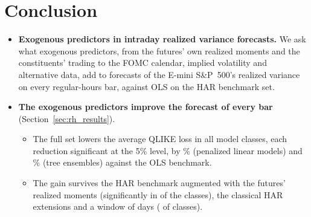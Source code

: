 \section{Conclusion}
\label{sec:rh_conclusion}
\begin{itemize}
\item \textbf{Exogenous predictors in intraday realized variance forecasts.} We ask what exogenous predictors, from
  the futures' own realized moments and the constituents' trading to the FOMC calendar, implied volatility and
  alternative data, add to forecasts of the E-mini S\&P~500's realized variance on every regular-hours bar,
  against OLS on the HAR benchmark set.
\item \textbf{The exogenous predictors improve the forecast of every bar} (Section~\ref{sec:rh_results}).
  \begin{itemize}
  \item The full set lowers the average QLIKE loss in all \rhorAfPairs{} model classes, each reduction significant at
    the 5\% level, by \rhorVsOlsRedLinRng{}\% (penalized linear models) and \rhorVsOlsRedTreeRng{}\%
    (tree ensembles) against the OLS benchmark.
  \item The gain survives the HAR benchmark augmented with the futures' realized moments (significantly in
    \rhabNClassesBeatAddRm{} of the \rhabNClassesAddRm{} classes), the classical HAR extensions and a window of
    \rhrbWinLong{} days (\rhrbNFullLowerSigBarLong{} of \rhrbNModelsLong{} classes).
  \end{itemize}

\end{itemize}
